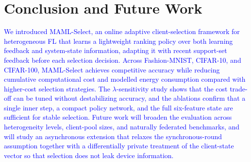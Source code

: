 \documentclass[journal]{IEEEtran}
\newcommand{\revision}[1]{\textcolor{blue}{#1}}
\begin{document}
\section{Conclusion and Future Work}
\revision{We introduced MAML-Select, an online adaptive client-selection framework for heterogeneous FL that learns a lightweight ranking policy over both learning feedback and system-state information, adapting it with recent support-set feedback before each selection decision.
Across Fashion-MNIST, CIFAR-10, and CIFAR-100, MAML-Select achieves competitive accuracy while reducing cumulative computational cost and modelled energy consumption compared with higher-cost selection strategies. The $\lambda$-sensitivity study shows that the cost trade-off can be tuned without destabilizing accuracy, and the ablations confirm that a single inner step, a compact policy network, and the full six-feature state are sufficient for stable selection. Future work will broaden the evaluation across heterogeneity levels, client-pool sizes, and naturally federated benchmarks, and will study an asynchronous extension that relaxes the synchronous-round assumption together with a differentially private treatment of the client-state vector so that selection does not leak device information.}
\end{document}
